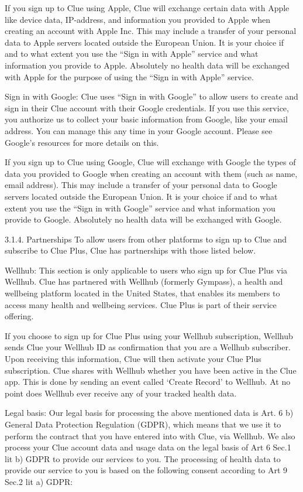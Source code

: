 If you sign up to Clue using Apple, Clue will exchange certain data with Apple like device data, IP-address, and information you provided to Apple when creating an account with Apple Inc. This may include a transfer of your personal data to Apple servers located outside the European Union. It is your choice if and to what extent you use the “Sign in with Apple” service and what information you provide to Apple. Absolutely no health data will be exchanged with Apple for the purpose of using the “Sign in with Apple” service.

Sign in with Google: Clue uses “Sign in with Google” to allow users to create and sign in their Clue account with their Google credentials. If you use this service, you authorize us to collect your basic information from Google, like your email address. You can manage this any time in your Google account. Please see Google's resources for more details on this.

If you sign up to Clue using Google, Clue will exchange with Google the types of data you provided to Google when creating an account with them (such as name, email address). This may include a transfer of your personal data to Google servers located outside the European Union. It is your choice if and to what extent you use the “Sign in with Google” service and what information you provide to Google. Absolutely no health data will be exchanged with Google.

3.1.4. Partnerships
To allow users from other platforms to sign up to Clue and subscribe to Clue Plus, Clue has partnerships with those listed below.

Wellhub: This section is only applicable to users who sign up for Clue Plus via Wellhub. Clue has partnered with Wellhub (formerly Gympass), a health and wellbeing platform located in the United States, that enables its members to access many health and wellbeing services. Clue Plus is part of their service offering.

If you choose to sign up for Clue Plus using your Wellhub subscription, Wellhub sends Clue your Wellhub ID as confirmation that you are a Wellhub subscriber. Upon receiving this information, Clue will then activate your Clue Plus subscription. Clue shares with Wellhub whether you have been active in the Clue app. This is done by sending an event called ‘Create Record’ to Wellhub. At no point does Wellhub ever receive any of your tracked health data.

Legal basis: Our legal basis for processing the above mentioned data is Art. 6 b) General Data Protection Regulation (GDPR), which means that we use it to perform the contract that you have entered into with Clue, via Wellhub. We also process your Clue account data and usage data on the legal basis of Art 6 Sec.1 lit b) GDPR to provide our services to you. The processing of health data to provide our service to you is based on the following consent according to Art 9 Sec.2 lit a) GDPR:

